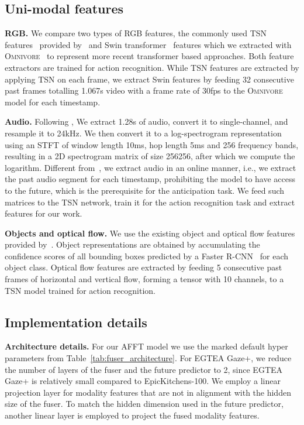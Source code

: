 \documentclass[10pt,twocolumn,letterpaper,dvipsnames]{article}
\newcommand{\sname}{AFFT}
\begin{document}
\subsection{Uni-modal features}
\label{sec:feature-extraction}
\noindent\textbf{RGB.} We compare two types of RGB features, the commonly used TSN features~\cite{wangTemporalSegmentNetworks2016} provided by~\cite{furnariWhatWouldYou2019} and Swin transformer~\cite{liu2021swin} features which we extracted with \textsc{Omnivore}~\cite{girdharOmnivoreSingleModel2022} to represent more recent transformer based approaches. Both feature extractors are trained for action recognition. While TSN features are extracted by applying TSN on each frame, we extract Swin features by feeding 32 consecutive past frames totalling 1.067s video with a frame rate of 30fps to the \textsc{Omnivore} model for each timestamp.

\noindent\textbf{Audio.} Following \cite{kazakosEPICFusionAudioVisualTemporal2019}, We extract 1.28s of audio, convert it to single-channel, and resample it to 24kHz. We then convert it to a log-spectrogram representation using an STFT of window length 10ms, hop length 5ms and 256 frequency bands, resulting in a 2D spectrogram matrix of size 256256, after which we compute the logarithm. Different from~\cite{kazakosEPICFusionAudioVisualTemporal2019}, we extract audio in an online manner, i.e., we extract the past audio segment for each timestamp, prohibiting the model to have access to the future, which is the prerequisite for the anticipation task. We feed such matrices to the TSN network, train it for the action recognition task and extract features for our work.

\noindent\textbf{Objects and optical flow.} We use the existing object and optical flow features provided by~\cite{furnariWhatWouldYou2019}. Object representations are obtained by accumulating the confidence scores of all bounding boxes predicted by a Faster R-CNN~\cite{ren2015faster} for each object class. Optical flow features are extracted by feeding 5 consecutive past frames of horizontal and vertical flow, forming a tensor with 10 channels, to a TSN model trained for action recognition.

\subsection{Implementation details}
\label{sec:implementation}
\noindent\textbf{Architecture details.} For our \sname{} model we use the marked default hyper parameters from Table~\ref{tab:fuser_architecture}. For EGTEA Gaze+, we reduce the number of layers of the fuser and the future predictor to 2, since EGTEA Gaze+ is relatively small compared to EpicKitchens-100. We employ a linear projection layer for modality features that are not in alignment with the hidden size of the fuser. To match the hidden dimension used in the future predictor, another linear layer is employed to project the fused modality features.
\end{document}
